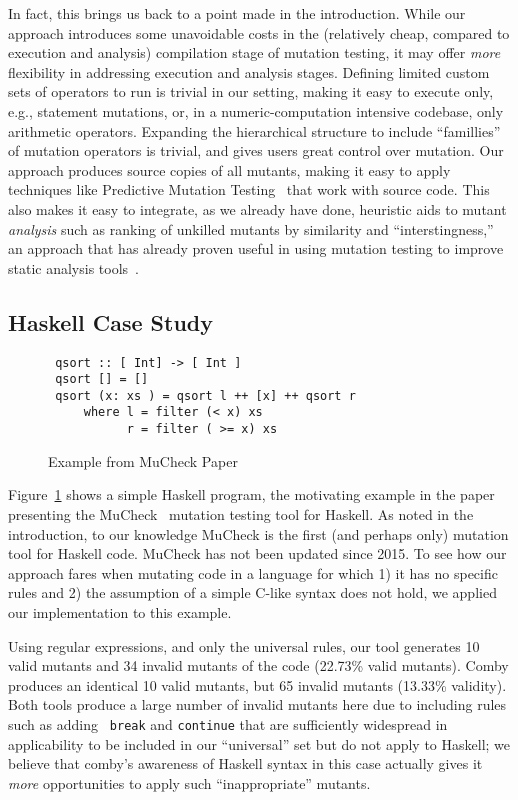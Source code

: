 \documentclass[acmsmall,screen,review,anonymous]{acmart}
\begin{document}
{In fact, this brings us back to a point made in the introduction.
While our approach introduces some unavoidable costs in the
(relatively cheap, compared to execution and analysis) compilation stage of
mutation testing, it may offer \emph{more} flexibility in addressing
execution and analysis stages.  Defining limited custom sets of
operators to run is trivial in our setting, making it easy to
execute only, e.g., statement mutations, or, in a numeric-computation
intensive codebase, only arithmetic operators.  Expanding the
hierarchical structure to include ``famillies'' of mutation operators
is trivial, and gives users great control over mutation.  Our approach
produces source
copies of all mutants, making it easy to apply techniques
like Predictive Mutation Testing~\cite{zhangPMT} that work with source
code.  This also makes it easy to integrate, as we already have done, heuristic
aids to mutant \emph{analysis} such as ranking of unkilled mutants by
similarity and ``interstingness,'' an approach that has already proven
useful in using mutation testing to improve static analysis tools~\cite{StatMut}.
\subsection{Haskell Case Study}

\begin{figure}

\begin{lstlisting}
 qsort :: [ Int] -> [ Int ]
 qsort [] = []
 qsort (x: xs ) = qsort l ++ [x] ++ qsort r
     where l = filter (< x) xs
           r = filter ( >= x) xs
\end{lstlisting}
\caption{\small Example from MuCheck Paper~\cite{mucheck}}
\label{fig:haskell}
\end{figure}

Figure~\ref{fig:haskell} shows a simple Haskell program, the
motivating example in the paper presenting the MuCheck~\cite{mucheck}
mutation testing tool for Haskell.  As noted in the introduction, to our
knowledge MuCheck is the first (and perhaps only) mutation tool for
Haskell code.  MuCheck has not been updated since 2015.
To see how our approach fares when mutating code in a language for
which 1) it has no specific rules and 2) the assumption of a simple
C-like syntax does not hold, we applied our implementation to this example.

Using regular expressions, and only the universal rules, our tool
generates 10 valid mutants and 34 invalid mutants of the code (22.73\%
valid mutants).  Comby produces an identical 10 valid mutants, but 65
invalid mutants (13.33\% validity).  Both tools produce a large number
of invalid mutants here due to including rules such as adding {\tt
  break} and {\tt continue} that are sufficiently widespread in
applicability to be included in our ``universal'' set but do not apply
to Haskell; we believe that comby's awareness of Haskell syntax in
this case actually gives it \emph{more} opportunities to apply such
``inappropriate'' mutants.

}
\end{document}
